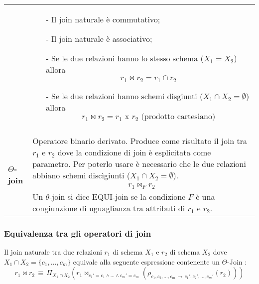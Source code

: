 \documentclass[a4paper, 10pt]{report}
\begin{document}
\begin{longtable}{| p{} | p{} |}
 & \begin{itemize}
\item[-] Il join naturale è commutativo;
\item[-] Il join naturale è associativo;
\item[-] Se le due relazioni hanno lo stesso schema ($X_1 = X_2$) allora $$r_1 \Join r_2 = r_1 \cap r_2$$
\item[-] Se le due relazioni hanno schemi disgiunti ($X_1 \cap X_2 = \emptyset$) allora $$r_1 \Join r_2 = r_1 \text{ x } r_2 \text{ (prodotto cartesiano)}$$
\end{itemize}
\\\\
\textbf{$\Theta$-join} & Operatore binario derivato. Produce come risultato il join tra $r_1$ e $r_2$ dove la condizione di join è esplicitata come parametro. Per poterlo usare è necessario che le due relazioni abbiano schemi discìgiunti ($X_1 \cap X_2 = \emptyset$).
\begin{align*}
r_1 \Join_F r_2 
\end{align*}
Un $\theta$-join si dice EQUI-join se la condizione $F$ è una congiunzione di uguaglianza tra attributi di $r_1$ e $r_2$.
\end{longtable}

\subsubsection*{Equivalenza tra gli operatori di join}
			Il join naturale tra due relazioni $r_1$ di schema $X_1$ e $r_2$ di schema $X_2$ dove 
			$ X_1 \cap X_2 = \{ c_1, \dots , c_m \} $ equivale alla seguente espressione contenente un $\Theta$-Join :
			\[
				r_1 \Join r_2 \, \equiv \, \Pi_{X_1 \cap X_2} ( r_1 \Join_{c_1' = c_1 \wedge \dots \wedge c_m' = c_m}
					( \rho_{c_1, c_2, \dots , c_m \, \rightarrow \, c_1', c_2', \dots , c_m'} (r_2) ) )
			\]
\end{document}
